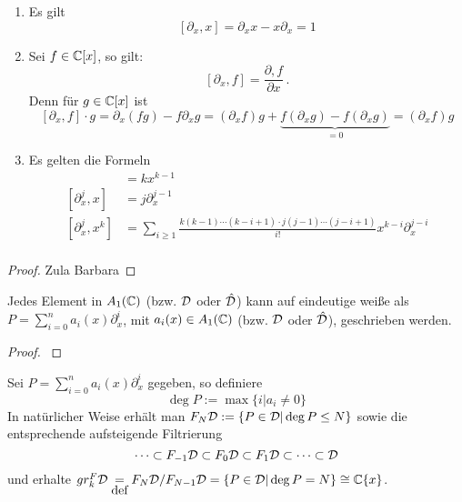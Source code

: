 \begin{prop} %
  \begin{enumerate}
    \item Es gilt
      \[[ \partial_x,x] = \partial_xx-x\partial_x=1 \]
    \item Sei $f\in \mathbb{C}[x]$, so gilt:
      \[ [\partial_x,f] = \frac{\partial,f}{\partial x} \,. \]
      Denn für $g\in \mathbb{C}[x]$ ist
      \[
        [\partial_x,f]\cdot g=\partial_x(fg)-f\partial_xg=
        (\partial_xf)g+\underset{=0}{\underbrace{ 
            f(\partial_xg)-f(\partial_xg)}}=
        (\partial_xf)g
      \]
    \item Es gelten die Formeln\\
    \begin{align*}
      [\partial_x,x^k]   &= kx^{k-1}\\
      [\partial_x^j,x]   &= j\partial_x^{j-1}\\
      [\partial_x^j,x^k] &= \sum_{i\geq1}\frac{k(k-1)\cdots(k-i+1)
        \cdot j(j-1)\cdots(j-i+1)}{i!}x^{k-i}\partial_x^{j-i} \\
    \end{align*}
  \end{enumerate}
\end{prop}
\begin{proof}
  Zula Barbara
\end{proof}

\begin{prop} \label{prop:weyl_eindeutige_schreibung}
  Jedes Element in $A_1(\mathbb{C})$ (bzw. $\mathcal{D}$ oder $\hat{\mathcal{D}}$) kann auf eindeutige
  weiße als $P=\sum_{i=0}^na_i(x)\partial_x^i$, mit $a_i(x)\in A_1(\mathbb{C})$ (bzw.
  $\mathcal{D}$ oder $\hat{\mathcal{D}}$), geschrieben werden. 
\end{prop}
\begin{proof}
  \cite[Proposition 1.2.3]{sabbah_cimpa90}
  \begin{comment}
    ein teil des Beweises ist "left as an exersice"
  \end{comment}
\end{proof}



\begin{defn}
  Sei $P=\sum_{i=0}^na_i(x)\partial_x^i$ gegeben, so definiere 
  \[
    \deg P:=\max\{i|a_i\neq 0\}
  \]
  In natürlicher Weise erhält man $F_N\mathcal{D}:=\{P\in\mathcal{D}|\deg P\leq N\}$ sowie die
  entsprechende aufsteigende Filtrierung
  \[
    \cdots\subset F_{-1}\mathcal{D}\subset F_{0}\mathcal{D}\subset
    F_{1}\mathcal{D}\subset\cdots\subset\mathcal{D}
  \]
  und erhalte $gr_k^F\mathcal{D}\underset{\mbox{def}}{=}F_N\mathcal{D}\slash F_{N-1}\mathcal{D}
  =\{P\in\mathcal{D}|\deg P=N\}\cong\mathbb{C}\{x\}$.
\end{defn}

